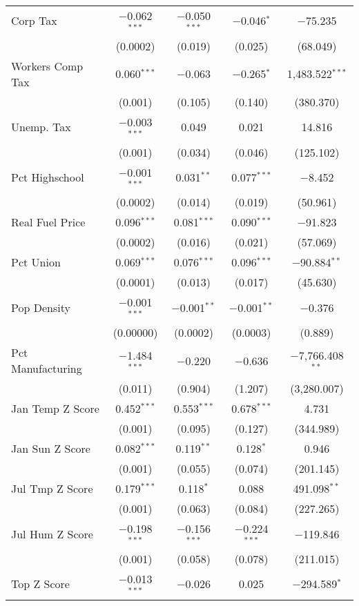 \begin{table}[!htbp]
\begin{tabular}{@{\extracolsep{5pt}}lcccc}
  Corp Tax & $-$0.062$^{***}$ & $-$0.050$^{***}$ & $-$0.046$^{*}$ & $-$75.235 \\ 
  & (0.0002) & (0.019) & (0.025) & (68.049) \\ 
  Workers Comp Tax & 0.060$^{***}$ & $-$0.063 & $-$0.265$^{*}$ & 1,483.522$^{***}$ \\ 
  & (0.001) & (0.105) & (0.140) & (380.370) \\ 
  Unemp. Tax & $-$0.003$^{***}$ & 0.049 & 0.021 & 14.816 \\ 
  & (0.001) & (0.034) & (0.046) & (125.102) \\ 
  Pct Highschool & $-$0.001$^{***}$ & 0.031$^{**}$ & 0.077$^{***}$ & $-$8.452 \\ 
  & (0.0002) & (0.014) & (0.019) & (50.961) \\ 
  Real Fuel Price & 0.096$^{***}$ & 0.081$^{***}$ & 0.090$^{***}$ & $-$91.823 \\ 
  & (0.0002) & (0.016) & (0.021) & (57.069) \\ 
  Pct Union & 0.069$^{***}$ & 0.076$^{***}$ & 0.096$^{***}$ & $-$90.884$^{**}$ \\ 
  & (0.0001) & (0.013) & (0.017) & (45.630) \\ 
  Pop Density & $-$0.001$^{***}$ & $-$0.001$^{**}$ & $-$0.001$^{**}$ & $-$0.376 \\ 
  & (0.00000) & (0.0002) & (0.0003) & (0.889) \\ 
  Pct Manufacturing & $-$1.484$^{***}$ & $-$0.220 & $-$0.636 & $-$7,766.408$^{**}$ \\ 
  & (0.011) & (0.904) & (1.207) & (3,280.007) \\ 
  Jan Temp Z Score & 0.452$^{***}$ & 0.553$^{***}$ & 0.678$^{***}$ & 4.731 \\ 
  & (0.001) & (0.095) & (0.127) & (344.989) \\ 
  Jan Sun Z Score & 0.082$^{***}$ & 0.119$^{**}$ & 0.128$^{*}$ & 0.946 \\ 
  & (0.001) & (0.055) & (0.074) & (201.145) \\ 
  Jul Tmp Z Score & 0.179$^{***}$ & 0.118$^{*}$ & 0.088 & 491.098$^{**}$ \\ 
  & (0.001) & (0.063) & (0.084) & (227.265) \\ 
  Jul Hum Z Score & $-$0.198$^{***}$ & $-$0.156$^{***}$ & $-$0.224$^{***}$ & $-$119.846 \\ 
  & (0.001) & (0.058) & (0.078) & (211.015) \\ 
  Top Z Score & $-$0.013$^{***}$ & $-$0.026 & 0.025 & $-$294.589$^{*}$ \\ 

\end{tabular}
\end{table}

